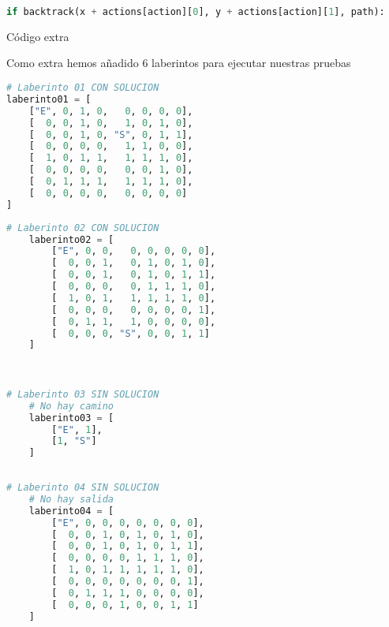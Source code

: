 \documentclass[a4paper,12pt]{article}
\begin{document}
\begin{lstlisting}[style=mystylepython, language=Python, caption= algoritmo backtracking]
    if backtrack(x + actions[action][0], y + actions[action][1], path):
\end{lstlisting}


\begin{center}
    \Large{Código extra}
\end{center}

Como extra hemos añadido 6 laberintos para ejecutar nuestras pruebas


\begin{minipage}[t]{8.2cm}
\begin{lstlisting}[style=mystylepython, language=Python, caption= laberinto01]
    # Laberinto 01 CON SOLUCION
laberinto01 = [
    ["E", 0, 1, 0,   0, 0, 0, 0],
    [  0, 0, 1, 0,   1, 0, 1, 0],
    [  0, 0, 1, 0, "S", 0, 1, 1],
    [  0, 0, 0, 0,   1, 1, 0, 0],
    [  1, 0, 1, 1,   1, 1, 1, 0],
    [  0, 0, 0, 0,   0, 0, 1, 0],
    [  0, 1, 1, 1,   1, 1, 1, 0],
    [  0, 0, 0, 0,   0, 0, 0, 0]
]
\end{lstlisting}
\end{minipage}
\hspace{9mm}
\begin{minipage}[t]{8.2cm}
\begin{lstlisting}[style=mystylepython, language=Python, caption= laberinto02]
    # Laberinto 02 CON SOLUCION
    laberinto02 = [
        ["E", 0, 0,   0, 0, 0, 0, 0],
        [  0, 0, 1,   0, 1, 0, 1, 0],
        [  0, 0, 1,   0, 1, 0, 1, 1],
        [  0, 0, 0,   0, 1, 1, 1, 0],
        [  1, 0, 1,   1, 1, 1, 1, 0],
        [  0, 0, 0,   0, 0, 0, 0, 1],
        [  0, 1, 1,   1, 0, 0, 0, 0],
        [  0, 0, 0, "S", 0, 0, 1, 1]
    ]
\end{lstlisting}
\end{minipage} \\

\begin{minipage}[t]{8.2cm}
\begin{lstlisting}[style=mystylepython, language=Python, caption= laberinto03]
    # Laberinto 03 SIN SOLUCION
    # No hay camino
    laberinto03 = [
        ["E", 1],
        [1, "S"]
    ]
    
\end{lstlisting}
\end{minipage}
\hspace{9mm}
\begin{minipage}[t]{8.2cm}
\begin{lstlisting}[style=mystylepython, language=Python, caption= laberinto04]
    # Laberinto 04 SIN SOLUCION
    # No hay salida
    laberinto04 = [
        ["E", 0, 0, 0, 0, 0, 0, 0],
        [  0, 0, 1, 0, 1, 0, 1, 0],
        [  0, 0, 1, 0, 1, 0, 1, 1],
        [  0, 0, 0, 0, 1, 1, 1, 0],
        [  1, 0, 1, 1, 1, 1, 1, 0],
        [  0, 0, 0, 0, 0, 0, 0, 1],
        [  0, 1, 1, 1, 0, 0, 0, 0],
        [  0, 0, 0, 1, 0, 0, 1, 1]
    ]
\end{lstlisting}
\end{minipage} \\ 
\end{document}
